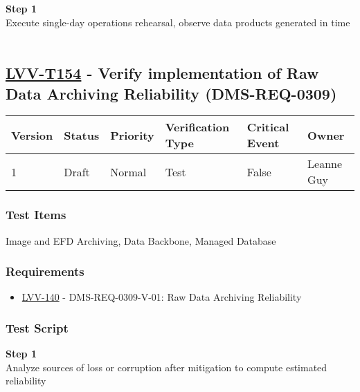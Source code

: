 \textbf{Step 1}\\
Execute single-day operations rehearsal, observe data products generated
in time\\
~\\

\hypertarget{lvv-t154---verify-implementation-of-raw-data-archiving-reliability-dms-req-0309}{%
\subsection{\texorpdfstring{\href{https://jira.lsstcorp.org/secure/Tests.jspa\#/testCase/LVV-T154}{LVV-T154}
- Verify implementation of Raw Data Archiving Reliability
(DMS-REQ-0309)}{LVV-T154 - Verify implementation of Raw Data Archiving Reliability (DMS-REQ-0309)}}\label{lvv-t154---verify-implementation-of-raw-data-archiving-reliability-dms-req-0309}}

\begin{longtable}[]{@{}llllll@{}}
\toprule
Version & Status & Priority & Verification Type & Critical Event &
Owner\tabularnewline
\midrule
\endhead
1 & Draft & Normal & Test & False & Leanne Guy\tabularnewline
\bottomrule
\end{longtable}

\hypertarget{test-items-130}{%
\subsubsection{Test Items}\label{test-items-130}}

Image and EFD Archiving, Data Backbone, Managed Database~

\hypertarget{requirements-131}{%
\subsubsection{Requirements}\label{requirements-131}}

\begin{itemize}
\tightlist
\item
  \href{https://jira.lsstcorp.org/browse/LVV-140}{LVV-140} -
  DMS-REQ-0309-V-01: Raw Data Archiving Reliability
\end{itemize}

\hypertarget{test-script-131}{%
\subsubsection{Test Script}\label{test-script-131}}

\textbf{Step 1}\\
Analyze sources of loss or corruption after mitigation to compute
estimated reliability\\
~\\

